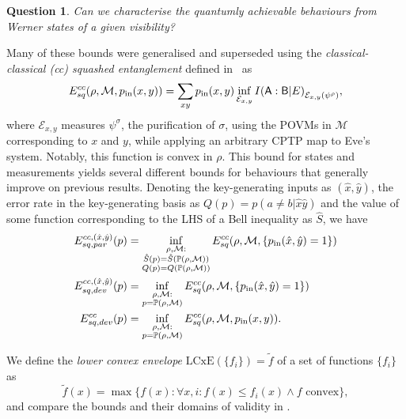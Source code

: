 \documentclass[10pt, a4paper]{article}
\numberwithin{equation}{section} %
\theoremstyle{definition}
\theoremstyle{plain}
\newtheorem{question}{Question}
\newcommand{\?}{\mathrel{?}} %
\newcommand{\sM}{\mathcal{M}}
\newcommand{\cE}{\mathcal{E}}
\newcommand{\cP}{\mathbb{P}}
\newcommand{\crv}[1]{\mathsf{#1}}
\newcommand{\LCxE}[1]{\mathrm{LCxE}\left(#1\right)}
\begin{document}
      \begin{question}
        Can we characterise the quantumly achievable behaviours from Werner states of a given visibility?
      \end{question}

      Many of these bounds were generalised and superseded using the \emph{classical-classical (cc) squashed entanglement} defined in~\cite{CCSquashedEntangle} as
      \begin{equation}
        E^{cc}_{sq}(\rho, \sM, p_{\rm in}(x,y)) = \sum_{xy} p_{\rm in}(x,y) \inf_{\cE_{x,y}} I{(\crv{A} : \crv{B}|E)}_{\cE_{x,y}(\psi^{\rho})},
      \end{equation}
      where \(\cE_{x,y}\) measures \(\psi^\sigma\), the purification of \({\sigma}\), using the POVMs in \(\sM\) corresponding to \(x\) and \(y\), while applying an arbitrary CPTP map to Eve's system. Notably, this function is convex in \(\rho\). This bound for states and measurements yields several different bounds for behaviours that generally improve on previous results. Denoting the key-generating inputs as \((\hat{x},\hat{y})\), the error rate in the key-generating basis as \(Q(p) = p(a\neq{b}|\hat{x}\hat{y})\) and the value of some function corresponding to the LHS of a Bell inequality as \(\hat{S}\), we have
      \begin{align}
        E^{cc,(\hat{x},\hat{y})}_{sq,par}(p) &= \inf_{\substack{\rho, \sM : \\ \hat{S}(p) = \hat{S}(\cP(\rho, \sM)) \\ Q(p) = Q(\cP(\rho, \sM)) }} E^{cc}_{sq}(\rho, \sM, \{p_{\rm in}(\hat{x},\hat{y})=1\}) \\
        E^{cc,(\hat{x},\hat{y})}_{sq,dev}(p) &= \inf_{\substack{\rho, \sM : \\ p = \cP(\rho, \sM)}} E^{cc}_{sq}(\rho, \sM, \{p_{\rm in}(\hat{x},\hat{y})=1\}) \\
        E^{cc}_{sq,dev}(p) &= \inf_{\substack{\rho, \sM : \\ p = \cP(\rho, \sM)}} E^{cc}_{sq}(\rho, \sM, p_{\rm in}(x,y)).
      \end{align}

      We define the \emph{lower convex envelope} \(\LCxE{\{f_i\}} = \tilde{f}\) of a set of functions \(\{f_i\}\) as
      \begin{equation}\label{eqn:LCxEdef}
        \tilde{f}(x) = \max\{ f(x) : \forall x, i : f(x) \leq f_i(x) \land f\text{ convex} \},
      \end{equation}
      and compare the bounds and their domains of validity in .
\end{document}
